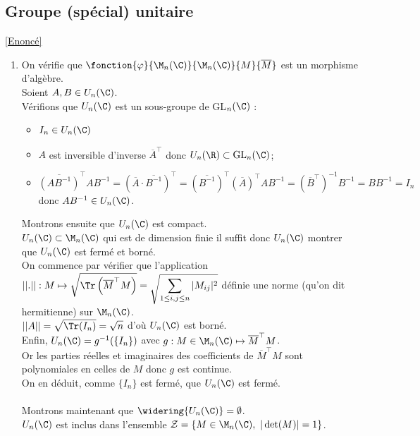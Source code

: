 \documentclass{book}
\begin{document}
	\subsection{Groupe (spécial) unitaire }
	\label{sec:groupe-special-unitaire-etoile3}
	\textcolor{blue}{\hyperref[Groupe (spécial) unitaire]{[Enoncé]}}\\
	\begin{enumerate}[leftmargin=*]
		\item On vérifie que $\fonction{\varphi}{\M_n(\C)}{\M_n(\C)}{M}{\overline{M}}$ est un morphisme d'algèbre.\\
		Soient $A,B\in U_n(\C)$.\\
		Vérifions que $U_n(\C)$ est un sous-groupe de GL$_n(\C)$ :
		\begin{itemize}
			\item $I_n\in U_n(\C)$
			\item $A$ est inversible d'inverse $\overline{A}^\top$ donc $U_n(\R)\subset \text{GL}_n(\C)$;
			\item $\overline{(AB^{-1})}^\top AB^{-1}=(\overline{A}\cdot\overline{B^{-1}})^\top=\left(\overline{B^{-1}}\right)^\top \left(\overline{A}\right)^\top AB^{-1}=\left(\overline{B}^\top\right)^{-1}B^{-1}=BB^{-1}=I_n$ donc $AB^{-1}\in U_n(\C)$.
		\end{itemize}
		Montrons ensuite que $U_n(\C)$ est compact.\\
		$U_n(\C)\subset \M_n(\C)$ qui est de dimension finie il suffit donc $U_n(\C)$ montrer que $U_n(\C)$ est fermé et borné.\\
		On commence par vérifier que l'application $||.||:M\mapsto \displaystyle\sqrt{\Tr\left(\overline{M}^\top M\right)}=\sqrt{\sum\limits_{1\leq i,j\leq n}|M_{ij}|^2}$ définie une norme (qu'on dit hermitienne) sur $\M_n(\C)$.\\ $||A||=\displaystyle\sqrt{\Tr(I_n)}=\displaystyle\sqrt{n}$ d'où $U_n(\C)$ est borné.\\
		Enfin, $U_n(\C)=g^{-1}(\{I_n\})$ avec $g:M\in \M_n(\C)\mapsto \overline{M}^\top M$.\\
		Or les parties réelles et imaginaires des coefficients de $\overline{M}^\top M$ sont polynomiales en celles de $M$ donc $g$ est continue.\\
		On en déduit, comme $\{I_n\}$ est fermé, que $U_n(\C)$ est fermé.\\\\
		Montrons maintenant que $\widering{U_n(\C)}=\emptyset$.\\
		$U_n(\C)$ est inclus dans l'ensemble $\mathcal{Z}=\{M\in \M_n(\C),\ |\det(M)|=1\}$.\\

\end{enumerate}
\end{document}
